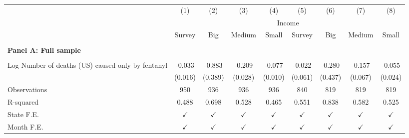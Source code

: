 \begin{tabular}{lcccccccc} \\ \hline 
                    &\multicolumn{1}{c}{(1)}         &\multicolumn{1}{c}{(2)}         &\multicolumn{1}{c}{(3)}         &\multicolumn{1}{c}{(4)}         &\multicolumn{1}{c}{(5)}         &\multicolumn{1}{c}{(6)}         &\multicolumn{1}{c}{(7)}         &\multicolumn{1}{c}{(8)}         \\
 & \multicolumn{8}{c}{Income} \\ \cline{2-5} \cline{6-9} & Survey  &  \multicolumn{1}{c}{Big} & \multicolumn{1}{c}{Medium}& \multicolumn{1}{c}{Small}  & Survey  &  \multicolumn{1}{c}{Big} & \multicolumn{1}{c}{Medium}& \multicolumn{1}{c}{Small} \\ \hline  & & & & &  &  &  &  \\ \textbf{Panel A: Full sample} \\ & & & & & & & & \\
Log Number of deaths (US) caused only by fentanyl&      -0.033\sym{*}  &      -0.883\sym{*}  &      -0.209\sym{***}&      -0.077\sym{***}&      -0.022         &      -0.280         &      -0.157\sym{*}  &      -0.055\sym{*}  \\
                    &     (0.016)         &     (0.389)         &     (0.028)         &     (0.010)         &     (0.061)         &     (0.437)         &     (0.067)         &     (0.024)         \\
\arrayrulecolor{black!10}\midrule
Observations        &         950         &         936         &         936         &         936         &         840         &         819         &         819         &         819         \\
R-squared           &       0.488         &       0.698         &       0.528         &       0.465         &       0.551         &       0.838         &       0.582         &       0.525         \\
State F.E.          &$\checkmark$         &$\checkmark$         &$\checkmark$         &$\checkmark$         &$\checkmark$         &$\checkmark$         &$\checkmark$         &$\checkmark$         \\
Month F.E.          &$\checkmark$         &$\checkmark$         &$\checkmark$         &$\checkmark$         &$\checkmark$         &$\checkmark$         &$\checkmark$         &$\checkmark$         \\



\end{tabular}
